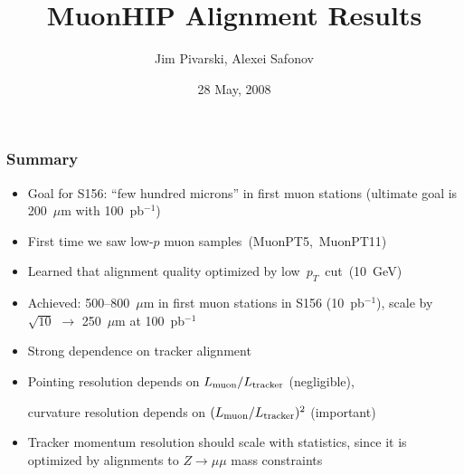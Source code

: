 \documentclass[compress]{beamer}
\title{MuonHIP Alignment Results}
\author{Jim Pivarski, Alexei Safonov}
\institute{Texas A\&M University}
\date{28 May, 2008}
\begin{document}
\frame{\titlepage}


\begin{frame}
\frametitle{Summary}

\begin{itemize}\setlength{\itemsep}{0.3 cm}
\item Goal for S156: ``few hundred microns'' in first muon stations (ultimate goal is 200~$\mu$m with 100~pb$^{-1}$)
\item First time we saw low-$p$ muon \mbox{samples (MuonPT5, MuonPT11)\hspace{-1 cm}}
\item Learned that alignment quality optimized by \mbox{low $p_T$ cut (10~GeV)\hspace{-1 cm}}
\item Achieved: 500--800~$\mu$m in first muon stations in S156 (10~pb$^{-1}$), scale by $\sqrt{10}$ $\to$ 250~$\mu$m at 100~pb$^{-1}$
\item Strong dependence on tracker alignment
\item Pointing resolution depends on $L_{\mbox{\scriptsize muon}} / L_{\mbox{\scriptsize tracker}}$ (negligible),

curvature resolution depends on $(L_{\mbox{\scriptsize muon}} / L_{\mbox{\scriptsize tracker}})^2$ (important)
\item Tracker momentum resolution should scale with statistics, since it is optimized by alignments to $Z\to\mu\mu$ mass constraints
\end{itemize}
\end{frame}
\end{document}

